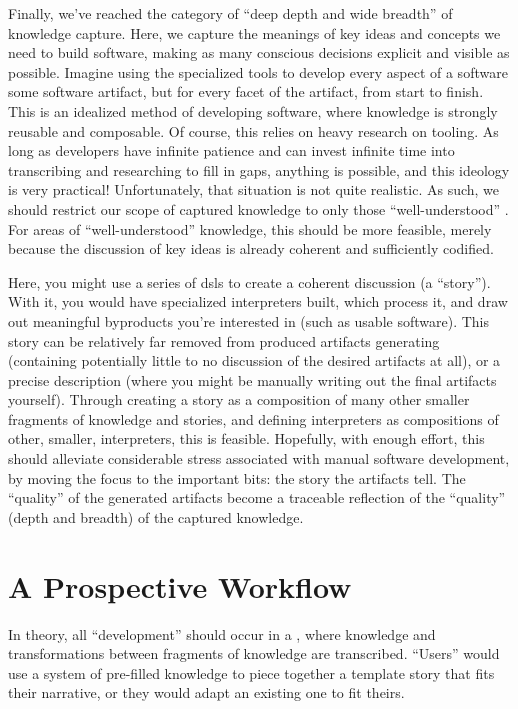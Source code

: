 Finally, we've reached the category of ``deep depth and wide breadth'' of
knowledge capture. Here, we capture the meanings of key ideas and concepts we
need to build software, making as many conscious decisions explicit and visible
as possible. Imagine using the specialized tools to develop every aspect of a
software some software artifact, but for every facet of the artifact, from start
to finish. This is an idealized method of developing software, where knowledge
is strongly reusable and composable. Of course, this relies on heavy research on
tooling. As long as developers have infinite patience and can invest infinite
time into transcribing and researching to fill in gaps, anything is possible,
and this ideology is very practical! Unfortunately, that situation is not quite
realistic. As such, we should restrict our scope of captured knowledge to only
those ``well-understood'' \cite{well-understood}. For areas of
``well-understood'' knowledge, this should be more feasible, merely because the
discussion of key ideas is already coherent and sufficiently codified.

Here, you might use a series of \aclp{dsl} to create a coherent discussion (a
``story''). With it, you would have specialized interpreters built, which
process it, and draw out meaningful byproducts you're interested in (such as
usable software). This story can be relatively far removed from produced
artifacts generating (containing potentially little to no discussion of the
desired artifacts at all), or a precise description (where you might be manually
writing out the final artifacts yourself). Through creating a story as a
composition of many other smaller fragments of knowledge and stories, and
defining interpreters as compositions of other, smaller, interpreters, this is
feasible. Hopefully, with enough effort, this should alleviate considerable
stress associated with manual software development, by moving the focus to the
important bits: the story the artifacts tell. The ``quality'' of the generated
artifacts become a traceable reflection of the ``quality'' (depth and breadth)
of the captured knowledge.

\section{A Prospective Workflow}
\label{chap:ideology:sec:a_prospective_workflow}

In theory, all ``development'' should occur in a , where knowledge and
transformations between fragments of knowledge are transcribed. ``Users'' would
use a system of pre-filled knowledge to piece together a template story that
fits their narrative, or they would adapt an existing one to fit theirs.

